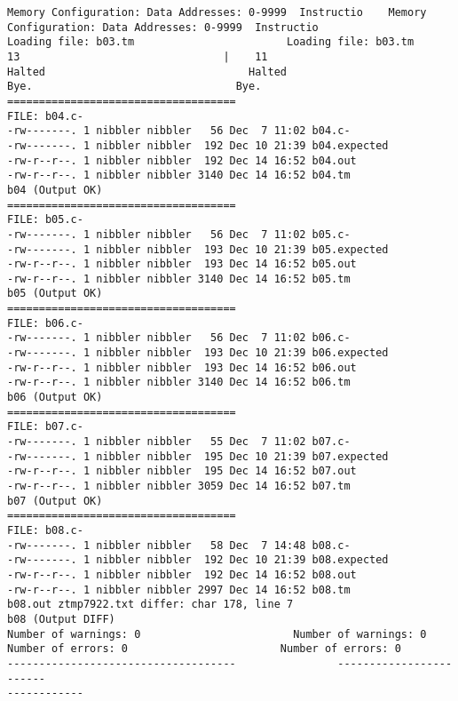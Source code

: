 \documentclass[12pt]{book}
\begin{document}
\begin{lstlisting}
Memory Configuration: Data Addresses: 0-9999  Instructio    Memory 
Configuration: Data Addresses: 0-9999  Instructio
Loading file: b03.tm                        Loading file: b03.tm
13                                |    11 
Halted                                Halted
Bye.                                Bye.
====================================
FILE: b04.c-
-rw-------. 1 nibbler nibbler   56 Dec  7 11:02 b04.c-
-rw-------. 1 nibbler nibbler  192 Dec 10 21:39 b04.expected
-rw-r--r--. 1 nibbler nibbler  192 Dec 14 16:52 b04.out
-rw-r--r--. 1 nibbler nibbler 3140 Dec 14 16:52 b04.tm
b04 (Output OK)
====================================
FILE: b05.c-
-rw-------. 1 nibbler nibbler   56 Dec  7 11:02 b05.c-
-rw-------. 1 nibbler nibbler  193 Dec 10 21:39 b05.expected
-rw-r--r--. 1 nibbler nibbler  193 Dec 14 16:52 b05.out
-rw-r--r--. 1 nibbler nibbler 3140 Dec 14 16:52 b05.tm
b05 (Output OK)
====================================
FILE: b06.c-
-rw-------. 1 nibbler nibbler   56 Dec  7 11:02 b06.c-
-rw-------. 1 nibbler nibbler  193 Dec 10 21:39 b06.expected
-rw-r--r--. 1 nibbler nibbler  193 Dec 14 16:52 b06.out
-rw-r--r--. 1 nibbler nibbler 3140 Dec 14 16:52 b06.tm
b06 (Output OK)
====================================
FILE: b07.c-
-rw-------. 1 nibbler nibbler   55 Dec  7 11:02 b07.c-
-rw-------. 1 nibbler nibbler  195 Dec 10 21:39 b07.expected
-rw-r--r--. 1 nibbler nibbler  195 Dec 14 16:52 b07.out
-rw-r--r--. 1 nibbler nibbler 3059 Dec 14 16:52 b07.tm
b07 (Output OK)
====================================
FILE: b08.c-
-rw-------. 1 nibbler nibbler   58 Dec  7 14:48 b08.c-
-rw-------. 1 nibbler nibbler  192 Dec 10 21:39 b08.expected
-rw-r--r--. 1 nibbler nibbler  192 Dec 14 16:52 b08.out
-rw-r--r--. 1 nibbler nibbler 2997 Dec 14 16:52 b08.tm
b08.out ztmp7922.txt differ: char 178, line 7
b08 (Output DIFF)
Number of warnings: 0                        Number of warnings: 0
Number of errors: 0                        Number of errors: 0
------------------------------------                ------------------------
------------


\end{lstlisting}
\end{document}
